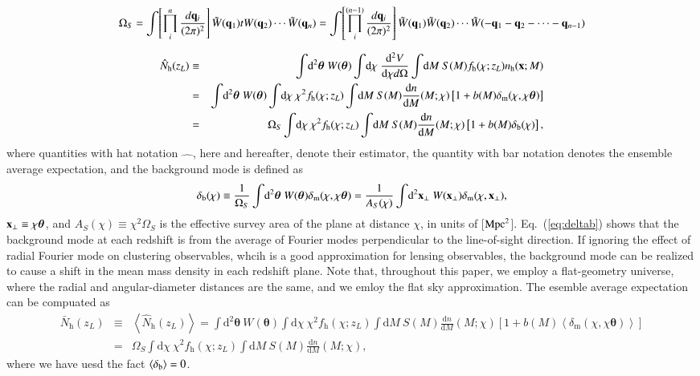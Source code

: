 \documentclass[onecolumn,notitlepage,showpacs,amsmath,amssymb,prd,floatfix]{revtex4-1}
\def\ave#1{\left\langle #1 \right\rangle}
\newcommand{\bx}{{\bf x}}
\newcommand{\btheta}{{\bm{\theta}}}
\newcommand{\bq}{{\bf q}}
\newcommand{\tW}{\tilde{W}}
\newcommand{\dr}{\mathrm{d}}
\newcommand{\deltab}{\delta_{\rm b}}
\newcommand{\deltam}{\delta_{\mathrm{m}}}
\newcommand{\bh}{\mathrm{h}}
\newcommand{\bnh}{\frac{\dr n}{\dr M}}
\begin{document}
\begin{equation}
 \Omega_S=\int\!\left[
		 \prod_i^n\frac{d\bq_i}{(2\pi)^2}
   \right]\tW(\bq_1)tW(\bq_2)\cdots\tW(\bq_n)
 =\int\!\left[
	 \prod_i^{(n-1)}\frac{d\bq_i}{(2\pi)^2}\right]
	 \tW(\bq_1)\tW(\bq_2)\cdots\tW(-\bq_1-\bq_2-
	 \cdots-\bq_{n-1})
\end{equation}



%
\begin{eqnarray}
  \hat{N}_{\bh}(z_L)&\equiv& \int\!\dr^2\btheta~W(\btheta)\int\!\dr\chi
  ~\frac{\dr^2V}{\dr\chi d\Omega} \int\!\dr M~ S(M)f_\bh(\chi;z_L)
  n_\bh(\bx;M)\nonumber\\
  &=&\int\!\dr^2\btheta~W(\btheta)\int\!\dr\chi~\chi^2
  f_\bh(\chi;z_L)\int\!\dr M~ S(M)\bnh(M;\chi)\left[
  1+b(M)\deltam(\chi,\chi\btheta)\right]\nonumber\\ &=&\Omega_S
  \int\!\dr\chi~\chi^2 f_\bh(\chi;z_L)\int\!\dr M~ S(M)\bnh(M;\chi)\left[
  1+b(M) \deltab(\chi)\right], \label{eq:eN}
\end{eqnarray}
%
where quantities with hat notation $\hat{\hspace{1em}}$, here and
hereafter, denote their estimator, the quantity with bar notation
denotes the ensemble average expectation, and
the background mode is
defined as
%
\begin{equation}
\deltab(\chi)\equiv
 \frac{1}{\Omega_S}\int\!\dr^2\btheta~W(\btheta)\deltam(\chi,\chi\btheta)
 =\frac{1}{A_S(\chi)}\int\!\dr^2\bx_\perp ~W(\bx_\perp)\deltam(\chi,\bx_\perp),
\end{equation}
%
$\bx_\perp\equiv \chi\btheta$, and $A_S(\chi)\equiv \chi^2\Omega_S$ is
the effective survey area of the plane at distance $\chi$, in units of
[${\rm Mpc}^2$]. Eq.~(\ref{eq:deltab}) shows that the background mode at
each redshift is from the average of Fourier modes perpendicular to the
line-of-sight direction. If ignoring the effect of radial Fourier mode
on clustering observables, whcih is a good approximation for lensing
observables, the background mode can be realized to cause a shift in the
mean mass density in each redshift plane. Note that, throughout this
paper, we employ a flat-geometry universe, where the radial and
angular-diameter distances are the same, and we emloy the flat sky
approximation.  The esemble average expectation can be compuated as
%
\begin{eqnarray}
 \bar{N}_\bh(z_L)&\equiv& \ave{\hat{N}_{\bh}(z_L)}=
\int\!\dr^2\btheta~W(\btheta)\int\!\dr\chi~\chi^2 f_\bh(\chi;z_L)\int\!\dr M~
  S(M)\bnh(M;\chi)\left[
		  1+b(M)\ave{\deltam(\chi,\chi\btheta)}\right]
  \nonumber\\
 &=&\Omega_S\int\!\dr\chi~\chi^2 f_\bh(\chi;z_L)\int\!\dr M~
  S(M)\bnh(M;\chi),
\end{eqnarray}
%
where we have uesd the fact $\ave{\deltab}=0$.
\end{document}

